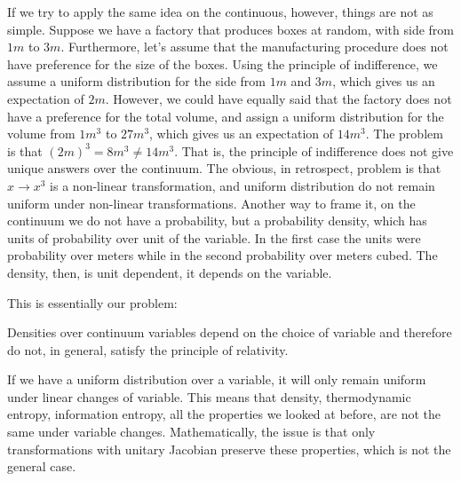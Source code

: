 If we try to apply the same idea on the continuous, however, things are not as simple. Suppose we have a factory that produces boxes at random, with side from $1m$ to $3m$. Furthermore, let's assume that the manufacturing procedure does not have preference for the size of the boxes. Using the principle of indifference, we assume a uniform distribution for the side from $1m$ and $3m$, which gives us an expectation of $2m$. However, we could have equally said that the factory does not have a preference for the total volume, and assign a uniform distribution for the volume from $1m^3$ to $27 m^3$, which gives us an expectation of $14 m^3$. The problem is that $(2m)^3 = 8 m^3 \neq 14 m^3$. That is, the principle of indifference does not give unique answers over the continuum. The obvious, in retrospect, problem is that $x \to x^3$ is a non-linear transformation, and uniform distribution do not remain uniform under non-linear transformations. Another way to frame it, on the continuum we do not have a probability, but a probability density, which has units of probability over unit of the variable. In the first case the units were probability over meters while in the second probability over meters cubed. The density, then, is unit dependent, it depends on the variable.

This is essentially our problem:
\begin{insight}
	Densities over continuum variables depend on the choice of variable and therefore do not, in general, satisfy the principle of relativity.
\end{insight}
If we have a uniform distribution over a variable, it will only remain uniform under linear changes of variable. This means that density, thermodynamic entropy, information entropy, all the properties we looked at before, are not the same under variable changes. Mathematically, the issue is that only transformations with unitary Jacobian preserve these properties, which is not the general case.

